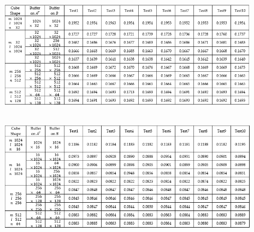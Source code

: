 \documentclass{amsart}
\theoremstyle{definition}
\theoremstyle{remark}
\numberwithin{equation}{section}
\begin{document}
\begin{appendix}
\\
\includegraphics[scale=0.5]{figures/Appendix_Alg2.jpg}\par

\\
\includegraphics[scale=0.5]{figures/Appendix_Alg3.jpg}\par

\end{appendix}
\newpage
\end{document}
